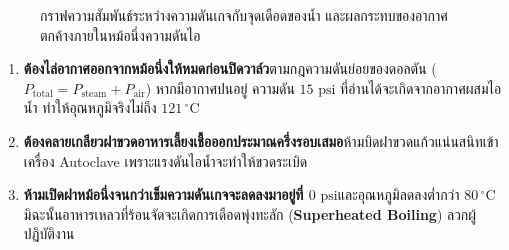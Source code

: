 \begin{figure}[H]
{%
}
\caption{กราฟความสัมพันธ์ระหว่างความดันเกจกับจุดเดือดของน้ำ และผลกระทบของอากาศตกค้างภายในหม้อนึ่งความดันไอ}
\end{figure}

\begin{warningbox}
\begin{enumerate}
    \item \textbf{ต้องไล่อากาศออกจากหม้อนึ่งให้หมดก่อนปิดวาล์ว}\quad ตามกฎความดันย่อยของดอลตัน ($P_{\text{total}} = P_{\text{steam}} + P_{\text{air}}$) หากมีอากาศปนอยู่ ความดัน $15\text{ psi}$ ที่อ่านได้จะเกิดจากอากาศผสมไอน้ำ ทำให้อุณหภูมิจริงไม่ถึง $121\,^\circ\text{C}$
    \item \textbf{ต้องคลายเกลียวฝาขวดอาหารเลี้ยงเชื้อออกประมาณครึ่งรอบเสมอ}\quad ห้ามบิดฝาขวดแก้วแน่นสนิทเข้าเครื่อง Autoclave เพราะแรงดันไอน้ำจะทำให้ขวดระเบิด
    \item \textbf{ห้ามเปิดฝาหม้อนึ่งจนกว่าเข็มความดันเกจจะลดลงมาอยู่ที่ $0\text{ psi}$}\quad และอุณหภูมิลดลงต่ำกว่า $80\,^\circ\text{C}$ มิฉะนั้นอาหารเหลวที่ร้อนจัดจะเกิดการเดือดพุ่งทะลัก (\textbf{Superheated Boiling}) ลวกผู้ปฏิบัติงาน
\end{enumerate}
\end{warningbox}


